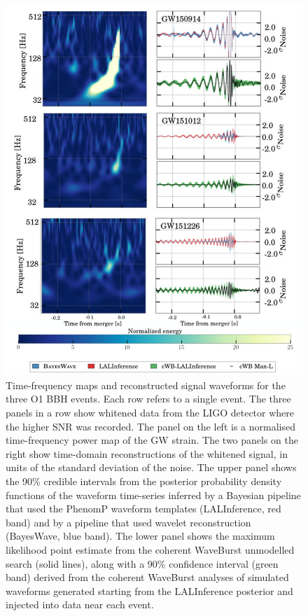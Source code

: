 \documentclass[binding=0.6cm, LaM]{sapthesis}
\begin{document}
        \begin{figure}[!t]
          \label{o1}
          \includegraphics[scale=0.4]{o1}
          \centering
          \caption{Time-frequency maps and reconstructed signal waveforms for the three O1 BBH events. Each row refers to a single event.  The three panels in a row show whitened data from the LIGO detector where the higher SNR was recorded. The panel on the left is a normalised time-frequency power map of the GW strain.  The two panels on the right show time-domain reconstructions of the whitened signal, in units of the standard deviation of the noise. The upper panel shows the 90\% credible intervals from the posterior probability density functions of the waveform time-series inferred by a Bayesian pipeline that used the PhenomP waveform templates ({\ttfamily LALInference}, red band) and by a pipeline that used wavelet reconstruction ({\ttfamily BayesWave}, blue band).  The lower panel shows the maximum likelihood point estimate from the {\ttfamily coherent WaveBurst} unmodelled search (solid lines), along with a 90\% confidence interval (green band) derived from the {\ttfamily coherent WaveBurst} analyses of simulated waveforms generated starting from the {\ttfamily LALInference} posterior and injected into data near each event. \cite{13}}
          \label{fig:o1}
        \end{figure}
\end{document}
